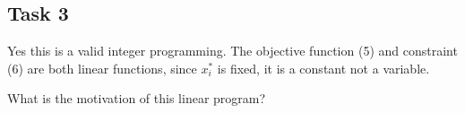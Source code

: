 \documentclass{article}
\begin{document}
\subsection*{Task 3}%
Yes this is a valid integer programming.
The objective function (5) and constraint (6) are both linear functions,
since $x_i^*$ is fixed, it is a constant not a variable.

What is the motivation of this linear program?



%
\end{document}
